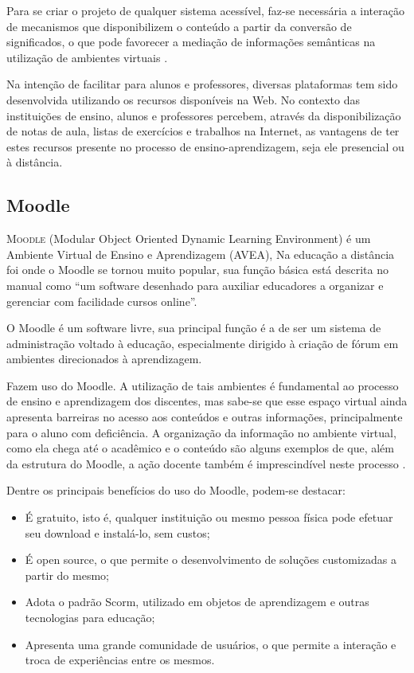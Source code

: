 Para se criar o projeto de qualquer sistema acessível, faz-se necessária a interação de mecanismos que disponibilizem o 
conteúdo a partir da conversão de significados, o que pode favorecer a mediação de informações semânticas na utilização 
de ambientes virtuais \cite{Paper2008}.

Na intenção de facilitar para alunos e professores, diversas plataformas tem sido desenvolvida utilizando os recursos 
disponíveis na Web. No contexto das instituições de ensino, alunos e professores percebem, através da disponibilização 
de notas de aula, listas de exercícios e trabalhos na Internet, as vantagens de ter estes recursos presente no processo 
de ensino-aprendizagem, seja ele presencial ou à distância.

\subsection{Moodle}
\lettrine{M}{oodle} (Modular Object Oriented Dynamic Learning Environment) é um Ambiente Virtual de Ensino e Aprendizagem (AVEA), Na educação a distância foi onde o Moodle se tornou muito popular, sua função básica está descrita no manual \cite{Moodle} como “um software desenhado para auxiliar educadores a organizar e gerenciar com facilidade cursos online”. 

O Moodle é um software livre, sua principal função é a de ser um sistema de administração voltado à educação, especialmente dirigido à criação de fórum em ambientes direcionados à aprendizagem.

Fazem uso do Moodle. A utilização de tais ambientes é fundamental ao processo de ensino e aprendizagem dos discentes, mas sabe-se que esse espaço virtual ainda apresenta barreiras no acesso aos conteúdos e 
outras informações, principalmente para o aluno com deficiência. A organização da informação no ambiente virtual, como 
ela chega até o acadêmico e o conteúdo são alguns exemplos de que, além da estrutura do Moodle, a ação docente 
também é imprescindível neste processo \cite{FIALHO}.

Dentre os principais benefícios do uso do Moodle, podem-se destacar:
\begin{itemize}
  \item{É gratuito, isto é, qualquer instituição ou mesmo pessoa física pode efetuar seu download e instalá-lo, sem custos;}
  \item{É open source, o que permite o desenvolvimento de soluções customizadas a partir do mesmo;}
  \item{Adota o padrão Scorm, utilizado em objetos de aprendizagem e outras tecnologias para educação;}
  \item{Apresenta uma grande comunidade de usuários, o que permite a interação e troca de experiências entre os mesmos.}
\end{itemize}

